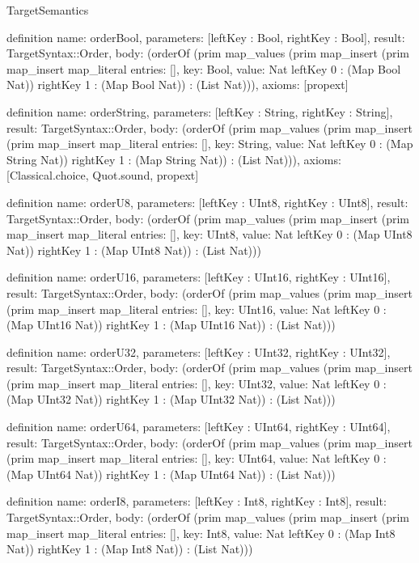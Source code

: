 \begin{lexlean}{TargetSemantics}
\begin{semanticmodule}
definition{
  name: orderBool,
  parameters: [leftKey : Bool, rightKey : Bool],
  result: TargetSyntax::Order,
  body: (orderOf (prim map_values (prim map_insert (prim map_insert map_literal{
    entries: [],
    key: Bool,
    value: Nat
  } leftKey 0 : (Map Bool Nat)) rightKey 1 : (Map Bool Nat)) : (List Nat))),
  axioms: [propext]
}

definition{
  name: orderString,
  parameters: [leftKey : String, rightKey : String],
  result: TargetSyntax::Order,
  body: (orderOf (prim map_values (prim map_insert (prim map_insert map_literal{
    entries: [],
    key: String,
    value: Nat
  } leftKey 0 : (Map String Nat)) rightKey 1 : (Map String Nat)) : (List Nat))),
  axioms: [Classical.choice, Quot.sound, propext]
}

definition{
  name: orderU8,
  parameters: [leftKey : UInt8, rightKey : UInt8],
  result: TargetSyntax::Order,
  body: (orderOf (prim map_values (prim map_insert (prim map_insert map_literal{
    entries: [],
    key: UInt8,
    value: Nat
  } leftKey 0 : (Map UInt8 Nat)) rightKey 1 : (Map UInt8 Nat)) : (List Nat)))
}

definition{
  name: orderU16,
  parameters: [leftKey : UInt16, rightKey : UInt16],
  result: TargetSyntax::Order,
  body: (orderOf (prim map_values (prim map_insert (prim map_insert map_literal{
    entries: [],
    key: UInt16,
    value: Nat
  } leftKey 0 : (Map UInt16 Nat)) rightKey 1 : (Map UInt16 Nat)) : (List Nat)))
}

definition{
  name: orderU32,
  parameters: [leftKey : UInt32, rightKey : UInt32],
  result: TargetSyntax::Order,
  body: (orderOf (prim map_values (prim map_insert (prim map_insert map_literal{
    entries: [],
    key: UInt32,
    value: Nat
  } leftKey 0 : (Map UInt32 Nat)) rightKey 1 : (Map UInt32 Nat)) : (List Nat)))
}

definition{
  name: orderU64,
  parameters: [leftKey : UInt64, rightKey : UInt64],
  result: TargetSyntax::Order,
  body: (orderOf (prim map_values (prim map_insert (prim map_insert map_literal{
    entries: [],
    key: UInt64,
    value: Nat
  } leftKey 0 : (Map UInt64 Nat)) rightKey 1 : (Map UInt64 Nat)) : (List Nat)))
}

definition{
  name: orderI8,
  parameters: [leftKey : Int8, rightKey : Int8],
  result: TargetSyntax::Order,
  body: (orderOf (prim map_values (prim map_insert (prim map_insert map_literal{
    entries: [],
    key: Int8,
    value: Nat
  } leftKey 0 : (Map Int8 Nat)) rightKey 1 : (Map Int8 Nat)) : (List Nat)))
}


\end{semanticmodule}
\end{lexlean}
